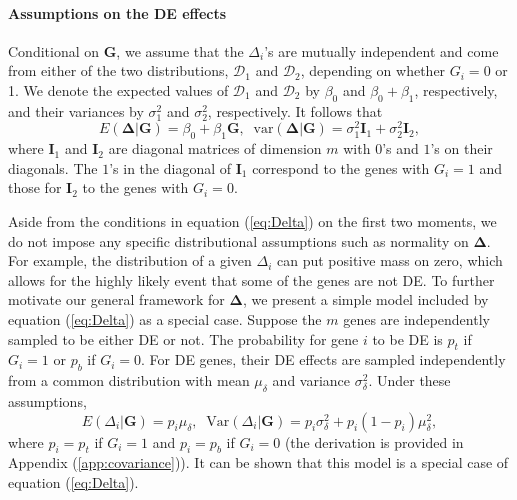 	\paragraph{Assumptions on the DE effects}\label{subsection:DeltaModel}
	Conditional on $\bm G$, we assume that the $\Delta_i$'s are mutually independent and come from
	either of the two distributions, $\mathscr{D}_1$ and $\mathscr{D}_2$, depending on whether 
	$G_i=0$	or 1. We denote the expected values of $\mathscr{D}_1$ and $\mathscr{D}_2$ by $\beta_0$ 
	and	$\beta_0+\beta_1$, respectively, and their variances by $\sigma_1^2$ and $\sigma_2^2$, 
    respectively. It follows that 
	\begin{equation}
	\label{eq:Delta}
	E(\bm \Delta|\bm G)=\beta_0 + \beta_1 \bm G,\;\; \mbox{var}(\bm \Delta|\bm G) = \sigma_1^2\bm
	I_1+\sigma_2^2\bm I_2,
	\end{equation} 
	where $\bm I_1$ and $\bm I_2$ are diagonal matrices of dimension $m$ with $0$'s and $1$'s on 
	their diagonals. The $1$'s in the diagonal of $\bm I_1$ correspond to the genes with $G_i=1$ 
	and those for $\bm I_2$ to the genes with $G_i=0$.
	
	Aside from the conditions in equation (\ref{eq:Delta}) on the first two moments, we do not 
	impose any specific distributional assumptions such as normality on $\bm \Delta$. For example, 
	the distribution of a given $\Delta_i$ can put positive mass on zero, which allows for the 
	highly likely event that some of the genes are not DE. To further motivate our general 
	framework for $\bm \Delta$, we present a simple model included by equation (\ref{eq:Delta}) as 
	a special case. Suppose the $m$ genes are independently sampled to be either DE or not. The 
	probability for gene $i$ to be DE is $p_t$ if $G_i=1$ or $p_b$ if $G_i=0$. For DE genes, their 
	DE effects are sampled independently from a common distribution with mean $\mu_\delta$ and 
	variance $\sigma^2_\delta$. Under these	assumptions, 
	\begin{equation}
	\label{eq:DeltaBinom}
	E(\Delta_i|\bm G) = p_i\mu_{\delta},\;\; \text{Var}(\Delta_i|\bm G)= p_i\sigma_{\delta}^2 +
	p_i(1-p_i)\mu_{\delta}^2,
	\end{equation}
	where $p_i=p_{t}$ if $G_i=1$ and $p_i=p_{b}$ if $G_i=0$ (the derivation is provided in Appendix 
	(\ref{app:covariance})). It can be shown that this model is a special case of equation 
	(\ref{eq:Delta}).
	
